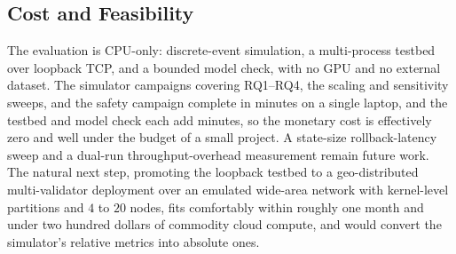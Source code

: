 \documentclass[journal]{IEEEtran}
\begin{document}
\subsection{Cost and Feasibility}
The evaluation is CPU-only: discrete-event simulation, a multi-process testbed over
loopback TCP, and a bounded model check, with no GPU and no external dataset. The simulator
campaigns covering RQ1--RQ4, the scaling and sensitivity sweeps, and the safety
campaign complete in minutes on a single laptop, and the testbed and model check each add minutes, so the
monetary cost is effectively zero and well under the budget of a small project. A state-size
rollback-latency sweep and a dual-run throughput-overhead measurement remain future
work. The natural next step, promoting the loopback testbed to a geo-distributed
multi-validator deployment over an emulated wide-area network with kernel-level partitions and
$4$ to $20$ nodes, fits comfortably within roughly one month and under two hundred dollars of
commodity cloud compute, and would convert the simulator's relative metrics into absolute ones.
\end{document}
